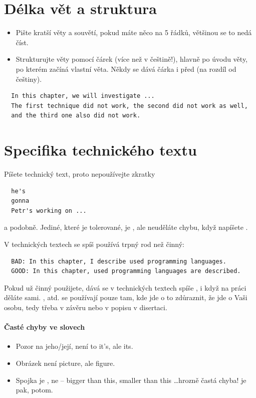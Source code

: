 \section{Délka vět a struktura}

\begin{itemize}
  \item{Pište kratší věty a souvětí, pokud máte něco na 5 řádků, většinou se to nedá číst.}
  \item{Strukturujte věty pomocí čárek (více než v češtině!), hlavně po úvodu věty, po kterém začíná vlastní věta. Někdy se dává čárka i před  (na rozdíl od češtiny).}
\end{itemize}
\begin{verbatim}
  In this chapter, we will investigate ... 
  The first technique did not work, the second did not work as well, 
  and the third one also did not work. 
\end{verbatim}

\section{Specifika technického textu}

Píšete technický text, proto nepoužívejte zkratky
\begin{verbatim}
  he's
  gonna
  Petr's working on ...
\end{verbatim}
\noindent a podobně. Jediné, které je tolerované, je , ale neuděláte chybu, když napíšete . 

\begin{samepage}
\noindent V technických textech se spíš používá trpný rod než činný: 
\begin{verbatim}
  BAD: In this chapter, I describe used programming languages. 
  GOOD: In this chapter, used programming languages are described.
\end{verbatim}
\end{samepage}

Pokud už činný použijete, dává se v technických textech spíše , i když na práci děláte sami. ,  atd. se používají pouze tam, kde jde o to zdůraznit, že jde o Vaši osobu, tedy třeba v závěru nebo v popisu  v disertaci.

\paragraph{Časté chyby ve slovech}

\begin{itemize}
  \item{Pozor na jeho/její, není to it's, ale its.}
  \item{Obrázek není picture, ale figure. }
  \item{Spojka  je , ne  -- bigger than this, smaller than this \ldots hrozně častá chyba!  je pak, potom.}
\end{itemize}


